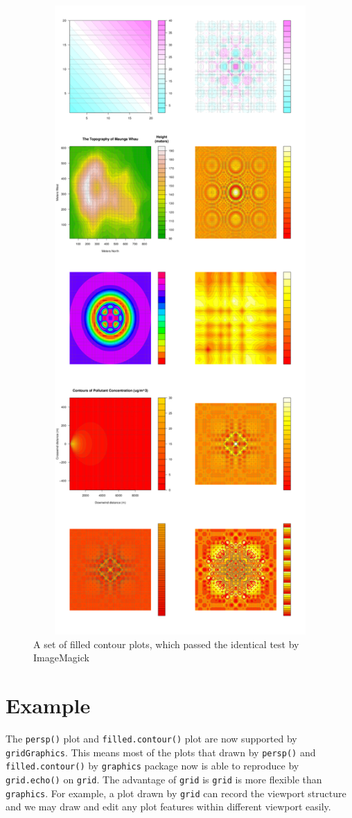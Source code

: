 \documentclass[paper=a4, fontsize=11pt]{report}
\begin{document}
\begin{figure}[h]
	\begin{center}
		\includegraphics[height = 24cm, width = 12cm]{figure/montage/filled-contour-montage.png}
		\caption{A set of filled contour plots, which passed the identical test by ImageMagick}
		\label{chapter5.3}
	\end{center}
\end{figure}


\chapter{Example}
The \texttt{persp()} plot and \texttt{filled.contour()} plot are now supported by \texttt{gridGraphics}. This means most of the plots that drawn by \texttt{persp()} and \texttt{filled.contour()} by \texttt{graphics} package now is able to reproduce by \texttt{grid.echo()} on \texttt{grid}. The advantage of \texttt{grid} is \texttt{grid} is more flexible than \texttt{graphics}. For example, a plot drawn by \texttt{grid} can record the viewport structure and we may draw and edit any plot features within different viewport easily.
\end{document}
